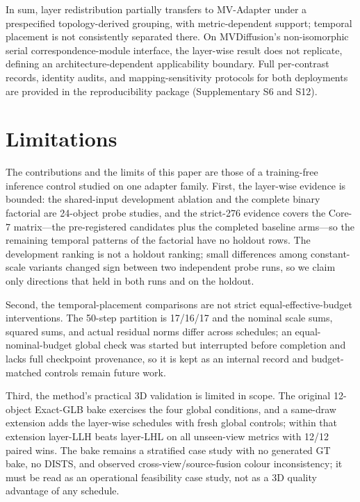 \documentclass[times,twocolumn,final]{elsarticle}
\begin{document}
In sum, layer redistribution partially transfers to MV-Adapter under a
prespecified topology-derived grouping, with metric-dependent support;
temporal placement is not consistently separated there. On MVDiffusion's
non-isomorphic serial correspondence-module interface, the layer-wise result
does not replicate, defining an architecture-dependent applicability
boundary. Full per-contrast records, identity audits, and mapping-sensitivity
protocols for both deployments are provided in the reproducibility package
(Supplementary S6 and S12).

\section{Limitations}
\label{sec:limitations}

The contributions and the limits of this paper are those of a training-free
inference control studied on one adapter family. First, the layer-wise
evidence is bounded: the shared-input development ablation and the complete
binary factorial are 24-object probe studies, and the strict-276 evidence
covers the Core-7 matrix---the pre-registered candidates plus the completed
baseline arms---so the remaining temporal patterns of the factorial have no
holdout rows. The development ranking is not a holdout ranking; small
differences among constant-scale variants changed sign between two
independent probe runs, so we claim only directions that held in both runs
and on the holdout.

Second, the temporal-placement comparisons are not strict
equal-effective-budget interventions. The 50-step partition is 17/16/17 and
the nominal scale sums, squared sums, and actual residual norms differ across
schedules; an equal-nominal-budget global check was started but interrupted
before completion and lacks full checkpoint provenance, so it is kept as an
internal record and budget-matched controls remain future work.

Third, the method's practical 3D validation is limited in scope. The
original 12-object Exact-GLB bake exercises the four global conditions, and a
same-draw extension adds the layer-wise schedules with fresh global controls;
within that extension layer-LLH beats layer-LHL on all unseen-view metrics
with 12/12 paired wins. The bake remains a stratified case study with no
generated GT bake, no DISTS, and observed cross-view/source-fusion colour
inconsistency; it must be read as an operational feasibility case study, not
as a 3D quality advantage of any schedule.
\end{document}
